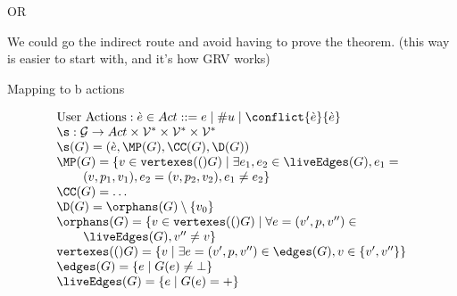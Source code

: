 OR

We could go the indirect route and avoid having to prove the theorem.
(this way is easier to start with, and it's how GRV works)

Mapping to b actions

\[
  \begin{array}{l}
    \textrm{User Actions}: \grave{e} \in Act ::= e \mid \#u \mid \conflict{\grave{e}}{\grave{e}}                                                       \\
    \s : \G \to Act \times \V^{\ast{}} \times \V^{\ast{}} \times \V^{\ast{}}                                                                                          \\
    \s(G) = (\grave{e}, \MP(G), \CC(G), \D(G))                                                                                                         \\
    \MP(G) = \left\{ v \in \vertexes(G) \mid \exists e_1,e_2 \in \liveEdges(G), e_1= \right.                                                           \\
    \qquad \left. (v,p_1,v_1), e_2=(v,p_2,v_2), e_1 \ne e_2 \right\}                                                                                   \\
    \CC(G) = \ldots                                                                                                                                    \\
    \D(G) = \orphans(G) \setminus \left\{ v_0 \right\}                                                                                                 \\
    \orphans(G) = \left\{ v \in \vertexes(G) \mid \forall e=(v^\prime,p,v^{\prime\prime}) \in \right.                                                  \\
    \qquad \left. \liveEdges(G), v^{\prime\prime} \ne v \right\}                                                                                       \\
    \vertexes(G) = \left\{ v \mid \exists e = (v^\prime, p, v^{\prime\prime}) \in \edges(G), v \in \left\{ v^\prime, v^{\prime\prime}\right\} \right\} \\
    \edges(G) = \left\{ e \mid G(e) \ne \bot \right\}                                                                                                  \\
    \liveEdges(G) = \left\{ e \mid G(e) = + \right\}                                                                                                   \\
  \end{array}
\]
